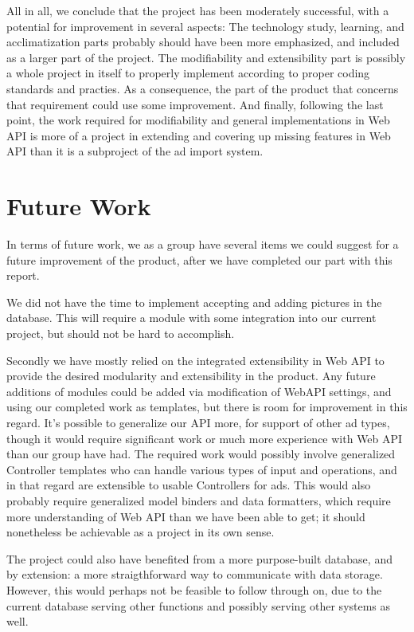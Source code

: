 All in all, we conclude that the project has been moderately successful, with a potential for improvement in several aspects: The technology study, learning, and acclimatization parts probably should have been more emphasized, and included as a larger part of the project. The modifiability and extensibility part is possibly a whole project in itself to properly implement according to proper coding standards and practies. As a consequence, the part of the product that concerns that requirement could use some improvement. And finally, following the last point, the work required for modifiability and general implementations in Web API is more of a project in extending and covering up missing features in Web API than it is a subproject of the ad import system. 

\section{Future Work}

In terms of future work, we as a group have several items we could suggest for a future improvement of the product, after we have completed our part with this report.

We did not have the time to implement accepting and adding pictures in the database. This will require a module with some integration into our current project, but should not be
hard to accomplish.

Secondly we have mostly relied on the integrated extensibility in Web API to provide the desired modularity and extensibility in the product. Any future additions of modules could be
added via modification of WebAPI settings, and using our completed work as templates, but there is room for improvement in this regard. It's possible to generalize our API more, for support
of other ad types, though it would require significant work or much more experience with Web API than our group have had. The required work would possibly involve generalized Controller templates
who can handle various types of input and operations, and in that regard are extensible to usable Controllers for ads. This would also probably require generalized model binders and data formatters, which require more understanding of Web API than we have been able to get; it should nonetheless be achievable as a project in its own sense.

The project could also have benefited from a more purpose-built database, and by extension: a more straigthforward way to communicate with data storage. However, this would perhaps not be feasible to follow through on, due to the current database serving other functions and possibly serving other systems as well.
